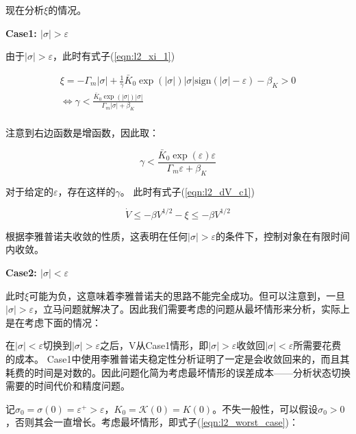 现在分析$\xi$的情况。

\textbf{Case1: $\left| \sigma \right|>\varepsilon$}

由于$\left| \sigma \right|>\varepsilon$，此时有式子(\ref{eqn:l2_xi_1})

\begin{equation}
    \begin{array}{c}
        \xi =-\varGamma _m\left| \sigma \right|+\frac{1}{\gamma}\bar{K}_0\exp \left( \left| \sigma \right| \right) \left| \sigma \right|\mathrm{sign}\left( \left| \sigma \right|-\varepsilon \right) -\beta _K>0\\
        \Longleftrightarrow \gamma <\frac{\bar{K}_0\exp \left( \left| \sigma \right| \right) \left| \sigma \right|}{\varGamma _m\left| \sigma \right|+\beta _K}\\
    \end{array}
    \label{eqn:l2_xi_1}
\end{equation}

注意到右边函数是增函数，因此取：

\begin{equation}
    \gamma <\frac{\bar{K}_0\exp \left( \varepsilon \right) \varepsilon}{\varGamma _m\varepsilon +\beta _K}
\end{equation}

对于给定的$\varepsilon$，存在这样的$\gamma$。
此时有式子(\ref{eqn:l2_dV_c1})

\begin{equation}
    \dot{V}\le -\beta V^{1/2}-\xi \le -\beta V^{1/2}
    \label{eqn:l2_dV_c1}
\end{equation}

根据李雅普诺夫收敛的性质，这表明在任何$\left| \sigma \right|>\varepsilon$的条件下，控制对象在有限时间内收敛。

\textbf{Case2: $\left| \sigma \right|<\varepsilon$}

此时$\xi$可能为负，这意味着李雅普诺夫的思路不能完全成功。但可以注意到，一旦$\left| \sigma \right|>\varepsilon$，立马问题就解决了。因此我们需要考虑的问题从最坏情形来分析，实际上是在考虑下面的情况：

在$\left| \sigma \right|<\varepsilon$切换到$\left| \sigma \right|>\varepsilon$之后，V从Case1情形，即$\left| \sigma \right|>\varepsilon$收敛回$\left| \sigma \right|<\varepsilon$所需要花费的成本。
Case1中使用李雅普诺夫稳定性分析证明了一定是会收敛回来的，而且其耗费的时间是对数的。因此问题化简为考虑最坏情形的误差成本——分析状态切换需要的时间代价和精度问题。

记$\sigma _0=\sigma \left( 0 \right) =\varepsilon ^+>\varepsilon$，$K_0=\mathcal{K} \left( 0 \right) =K\left( 0 \right)$。不失一般性，可以假设$\sigma_0>0$，否则其会一直增长。考虑最坏情形，即式子(\ref{eqn:l2_worst_case})：

